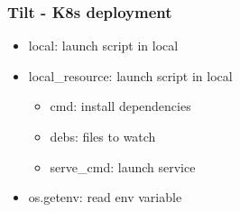 \subsubsection{Tilt - K8s deployment}
\begin{frame}[fragile]{\subsubsecname}
  \begin{itemize}
    \item local: launch script in local
    \item local\_resource: launch script in local
    \begin{itemize}
      \item cmd: install dependencies
      \item debs: files to watch
      \item serve\_cmd: launch service
    \end{itemize}
    \item os.getenv: read env variable
  \end{itemize}
\end{frame}

